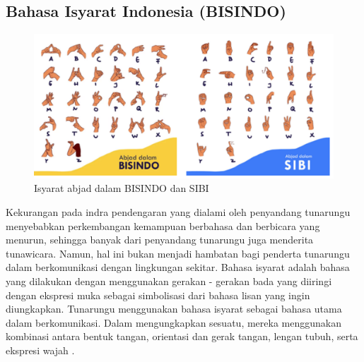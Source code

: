 \subsection{Bahasa Isyarat Indonesia (BISINDO)}
\begin{figure}[H]
    \centering

    \includegraphics[scale=0.6]{gambar/bab2-isyarat-indonesia.png}
 
    \caption{Isyarat abjad dalam BISINDO dan SIBI}
    \label{fig:isyaratindonesia}
\end{figure}

Kekurangan pada indra pendengaran yang dialami oleh penyandang tunarungu menyebabkan perkembangan kemampuan berbahasa dan berbicara yang menurun, sehingga banyak dari penyandang tunarungu juga menderita tunawicara. Namun, hal ini bukan menjadi hambatan bagi penderta tunarungu dalam berkomunikasi dengan lingkungan sekitar. Bahasa isyarat adalah bahasa yang dilakukan dengan menggunakan gerakan - gerakan bada yang diiringi dengan ekspresi muka sebagai simbolisasi dari bahasa lisan yang ingin diungkapkan. Tunarungu menggunakan bahasa isyarat sebagai bahasa utama dalam berkomunikasi. Dalam mengungkapkan sesuatu, mereka menggunakan kombinasi antara bentuk tangan, orientasi dan gerak tangan, lengan tubuh, serta ekspresi wajah \parencite{mursita2015}.


